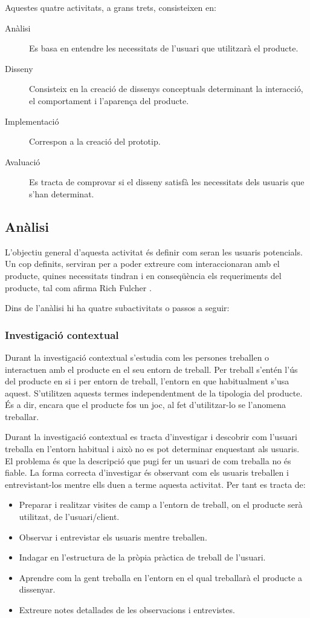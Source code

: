 Aquestes quatre activitats, a grans trets, consisteixen en:
\begin{description}
\item [Anàlisi] Es basa en entendre les necessitats de l'usuari que utilitzarà el producte.
\item [Disseny] Consisteix en la creació de dissenys conceptuals determinant la interacció, el comportament i l'aparença del producte.
\item [Implementació] Correspon a la creació del prototip.
\item [Avaluació] Es tracta de comprovar si el disseny satisfà les necessitats dels usuaris que s'han determinat.
\end{description}

\subsection{Anàlisi}\label{sec:analisi}
L'objectiu general d'aquesta activitat és definir com seran les usuaris potencials. Un cop definits, serviran per a poder extreure com interaccionaran amb el producte, quines necessitats tindran i en conseqüència els requeriments del producte, tal com afirma Rich Fulcher \cite{user_centred_design}.

Dins de l'anàlisi hi ha quatre subactivitats o passos a seguir:

\subsubsection{Investigació contextual}\label{subsec:investigacio_contextual}
Durant la investigació contextual s'estudia com les persones treballen o interactuen amb el producte en el seu entorn de treball. Per treball s'entén l'ús del producte en si i per entorn de treball, l'entorn en que habitualment s'usa aquest. S'utilitzen aquests termes independentment de la tipologia del producte. És a dir, encara que el producte fos un joc, al fet d'utilitzar-lo se l'anomena treballar. 

Durant la investigació contextual es tracta d'investigar i descobrir com l'usuari treballa en l'entorn habitual i això no es pot determinar enquestant als usuaris. El problema és que la descripció que pugi fer un usuari de com treballa no és fiable. La forma correcta d'investigar és observant com els usuaris treballen i entrevistant-los mentre ells duen a terme aquesta activitat. Per tant es tracta de:

\begin{itemize}
\item Preparar i realitzar visites de camp a l'entorn de treball, on el producte serà utilitzat, de l'usuari/client.
\item Observar i entrevistar els usuaris mentre treballen.
\item Indagar en l'estructura de la pròpia pràctica de treball de l'usuari.
\item Aprendre com la gent treballa en l'entorn en el qual treballarà el producte a dissenyar.
\item Extreure notes detallades de les observacions i entrevistes.
\end{itemize}

